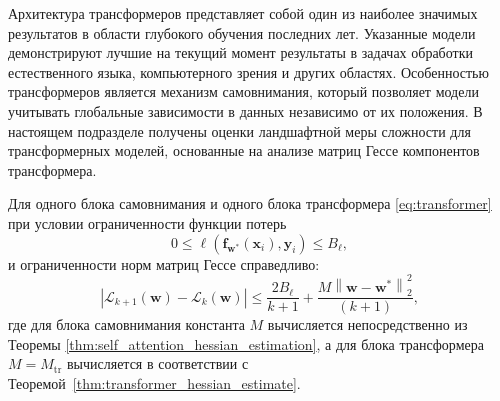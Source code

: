 Архитектура трансформеров представляет собой один из наиболее значимых результатов в области глубокого обучения последних лет. Указанные модели демонстрируют лучшие на текущий момент результаты в задачах обработки естественного языка, компьютерного зрения и других областях. Особенностью трансформеров является механизм самовнимания, который позволяет модели учитывать глобальные зависимости в данных независимо от их положения. В настоящем подразделе получены оценки ландшафтной меры сложности для трансформерных моделей, основанные на анализе матриц Гессе компонентов трансформера.

\begin{theorem}\label{chapter:complex:theorem-transformer-loss}
Для одного блока самовнимания и одного блока трансформера \ref{eq:transformer} при условии ограниченности функции потерь \[
    0 \leqslant \ell(\mathbf{f}_{\mathbf{w}^*}(\mathbf{x}_i), \mathbf{y}_i) \leqslant B_{\ell},
\]
и ограниченности норм матриц Гессе справедливо:
\[
    \left| \mathcal{L}_{k+1}(\mathbf{w}) - \mathcal{L}_k(\mathbf{w}) \right| \leqslant \frac{2B_{\ell}}{k+1} + \frac{M \left\| \mathbf{w} - \mathbf{w}^* \right\|_2^2}{(k+1)},
\]
где для блока самовнимания константа $M$ вычисляется непосредственно из Теоремы \ref{thm:self_attention_hessian_estimation},
а для блока трансформера \(M = M_{\text{tr}}\) вычисляется в соответствии с Теоремой~\ref{thm:transformer_hessian_estimate}.
\end{theorem}

